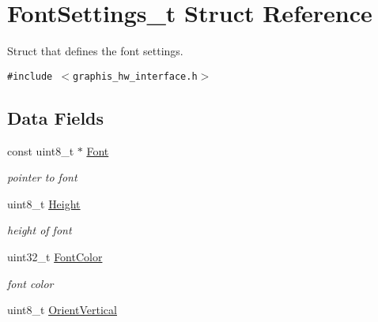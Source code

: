 \hypertarget{struct_font_settings__t}{
\section{FontSettings\_\-t Struct Reference}
\label{struct_font_settings__t}
}
Struct that defines the font settings.  


{\tt \#include $<$graphis\_\-hw\_\-interface.h$>$}

\subsection*{Data Fields}
\begin{CompactItemize}
\item 
\hypertarget{struct_font_settings__t_55020ad634f6d1277e1fbe68e7186190}{
const uint8\_\-t $\ast$ \hyperlink{struct_font_settings__t_55020ad634f6d1277e1fbe68e7186190}{Font}}
\label{struct_font_settings__t_55020ad634f6d1277e1fbe68e7186190}

\begin{CompactList}\small\item\em pointer to font \item\end{CompactList}\item 
\hypertarget{struct_font_settings__t_8e0cfd91eea56dd3997182d4c1e2fde1}{
uint8\_\-t \hyperlink{struct_font_settings__t_8e0cfd91eea56dd3997182d4c1e2fde1}{Height}}
\label{struct_font_settings__t_8e0cfd91eea56dd3997182d4c1e2fde1}

\begin{CompactList}\small\item\em height of font \item\end{CompactList}\item 
\hypertarget{struct_font_settings__t_c8726d406aea43f881a43f65f8767bf7}{
uint32\_\-t \hyperlink{struct_font_settings__t_c8726d406aea43f881a43f65f8767bf7}{FontColor}}
\label{struct_font_settings__t_c8726d406aea43f881a43f65f8767bf7}

\begin{CompactList}\small\item\em font color \item\end{CompactList}\item 
\hypertarget{struct_font_settings__t_dc43ec4c3257181827f79fe8d891212c}{
uint8\_\-t \hyperlink{struct_font_settings__t_dc43ec4c3257181827f79fe8d891212c}{OrientVertical}}
\label{struct_font_settings__t_dc43ec4c3257181827f79fe8d891212c}


\end{CompactItemize}
